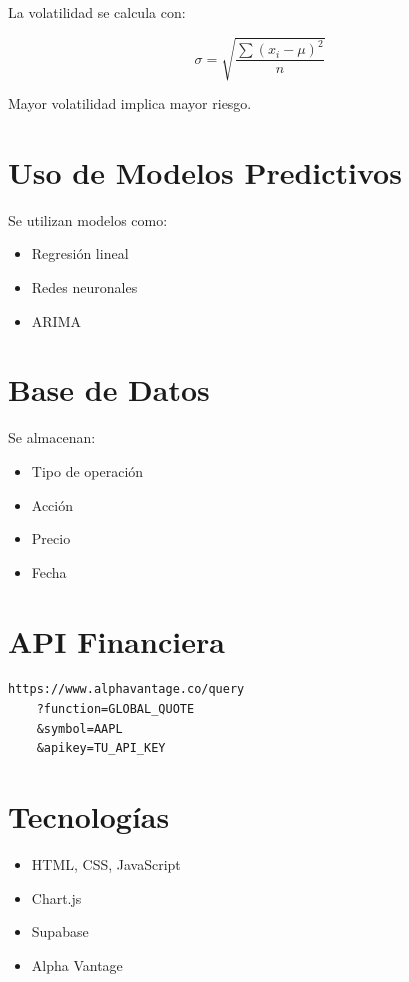 \documentclass[12pt,a4paper]{article}
\begin{document}
La volatilidad se calcula con:

\[
\sigma = \sqrt{\frac{\sum (x_i - \mu)^2}{n}}
\]

\begin{cajaconcepto}
Mayor volatilidad implica mayor riesgo.
\end{cajaconcepto}

\section{Uso de Modelos Predictivos}

Se utilizan modelos como:

\begin{itemize}
    \item Regresión lineal
    \item Redes neuronales
    \item ARIMA
\end{itemize}

\section{Base de Datos}

Se almacenan:

\begin{itemize}
    \item Tipo de operación
    \item Acción
    \item Precio
    \item Fecha
\end{itemize}

\section{API Financiera}

\begin{lstlisting}
https://www.alphavantage.co/query
    ?function=GLOBAL_QUOTE
    &symbol=AAPL
    &apikey=TU_API_KEY
\end{lstlisting}

\section{Tecnologías}

\begin{itemize}
    \item HTML, CSS, JavaScript
    \item Chart.js
    \item Supabase
    \item Alpha Vantage
\end{itemize}
\end{document}
